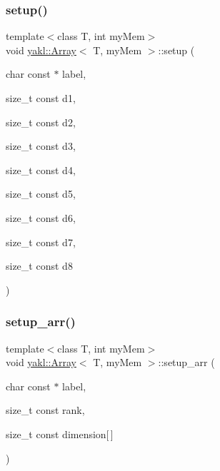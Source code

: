 \mbox{\label{classyakl_1_1Array_a2ea97ac7cd33db73f3e5bc9858b0c619}} 
\subsubsection{\texorpdfstring{setup()}{setup()}\hspace{0.1cm}{\footnotesize\ttfamily [8/8]}}
{\footnotesize\ttfamily template$<$class T, int my\+Mem$>$ \\
void \hyperlink{classyakl_1_1Array}{yakl\+::\+Array}$<$ T, my\+Mem $>$\+::setup (\begin{DoxyParamCaption}\item[{char const $\ast$}]{label,  }\item[{size\+\_\+t const}]{d1,  }\item[{size\+\_\+t const}]{d2,  }\item[{size\+\_\+t const}]{d3,  }\item[{size\+\_\+t const}]{d4,  }\item[{size\+\_\+t const}]{d5,  }\item[{size\+\_\+t const}]{d6,  }\item[{size\+\_\+t const}]{d7,  }\item[{size\+\_\+t const}]{d8 }\end{DoxyParamCaption})\hspace{0.3cm}{\ttfamily [inline]}}

\mbox{\label{classyakl_1_1Array_a9582283a5ac0d9f89cd80d41bc3d0273}} 
\subsubsection{\texorpdfstring{setup\+\_\+arr()}{setup\_arr()}}
{\footnotesize\ttfamily template$<$class T, int my\+Mem$>$ \\
void \hyperlink{classyakl_1_1Array}{yakl\+::\+Array}$<$ T, my\+Mem $>$\+::setup\+\_\+arr (\begin{DoxyParamCaption}\item[{char const $\ast$}]{label,  }\item[{size\+\_\+t const}]{rank,  }\item[{size\+\_\+t const}]{dimension\mbox{[}$\,$\mbox{]} }\end{DoxyParamCaption})\hspace{0.3cm}{\ttfamily [inline]}}

